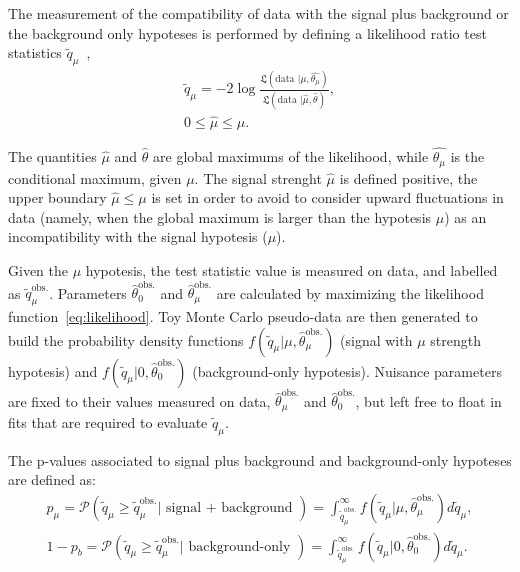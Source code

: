 \noindent The measurement of the compatibility of data with the signal plus background or the background only hypoteses is performed by defining a likelihood ratio test statistics $\tilde{q}_{\mu}$~\cite{bib:Asymptotic},
\begin{equation}
\begin{gathered}
\tilde{q}_{\mu} = -2 \log { \frac{\mathfrak{L} (\text{data }| \mu, \hat{\theta_{\mu}}) }{ \mathfrak{L} (\text{data }| \hat{\mu}, \hat{\theta})  } },\\
0 \leq \hat{\mu} \leq \mu.
\end{gathered}
\end{equation}

\noindent The quantities $\hat{\mu}$ and $\hat{\theta}$ are global maximums of the likelihood, while $\hat{\theta_{\mu}}$ is the conditional maximum, given $\mu$. The signal strenght $\hat{\mu}$ is defined positive, the upper boundary $\hat{\mu} \leq \mu$ is set in order to avoid to consider upward fluctuations in data (namely, when the global maximum is larger than the hypotesis $\mu$) as an incompatibility with the signal hypotesis ($\mu$).

\noindent Given the $\mu$ hypotesis, the test statistic value is measured on data, and labelled as $\tilde{q}_{\mu}^{\text{obs.}}$. Parameters $\hat{\theta}_0^{\text{obs.}}$ and $\hat{\theta}_{\mu}^{\text{obs.}}$ are calculated by maximizing the likelihood function~\ref{eq:likelihood}. Toy Monte Carlo pseudo-data are then generated to build the probability density functions $f(\tilde{q}_{\mu}|\mu, \hat{\theta}_{\mu}^{\text{obs.}})$ (signal with $\mu$ strength hypotesis) and $f(\tilde{q}_{\mu}|0, \hat{\theta}_0^{\text{obs.}})$ (background-only hypotesis). Nuisance parameters are fixed to their values measured on data, $\hat{\theta}_{\mu}^{\text{obs.}}$ and $\hat{\theta}_0^{\text{obs.}}$, but left free to float in fits that are required to evaluate $\tilde{q}_{\mu}$.

\noindent The p-values associated to signal plus background and background-only hypoteses are defined as:
\begin{equation}
\begin{gathered}
p_{\mu} = \mathcal{P} \left( \tilde{q}_{\mu} \geq \tilde{q}_{\mu}^{\text{obs.}} | \text{ signal + background } \right) = \int_{\tilde{q}_{\mu}^{\text{obs.}}}^{\infty} f(\tilde{q}_{\mu}|\mu, \hat{\theta}_{\mu}^{\text{obs.}}) d \tilde{q}_{\mu} ,\\
1 - p_b = \mathcal{P} \left( \tilde{q}_{\mu} \geq \tilde{q}_{\mu}^{\text{obs.}} | \text{ background-only } \right) = \int_{\tilde{q}_{\mu}^{\text{obs.}}}^{\infty} f(\tilde{q}_{\mu}|0, \hat{\theta}_{0}^{\text{obs.}}) d \tilde{q}_{\mu} .\\
\end{gathered}
\end{equation}

